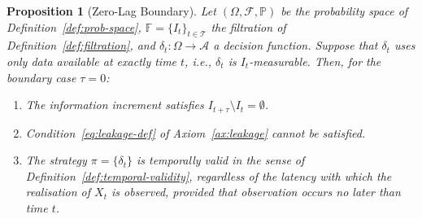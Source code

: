 \documentclass[12pt,openany]{book}
\newcommand{\calI}{\mathcal{I}}
\newcommand{\calA}{\mathcal{A}}
\numberwithin{equation}{chapter}
\theoremstyle{plain}
\newtheorem{proposition}[theorem]{Proposition}
\theoremstyle{definition}
\theoremstyle{remark}
\numberwithin{equation}{chapter}
\theoremstyle{plain}
\def\calI{I}%
\begin{document}
\begin{proposition}[Zero-Lag Boundary]
\label{prop:zero-lag}
Let $(\Omega, \mathcal{F}, \mathbb{P})$ be the probability space of
Definition~\ref{def:prob-space}, $\mathbb{F} = \{\calI_t\}_{t \in
\mathcal{T}}$ the filtration of Definition~\ref{def:filtration}, and
$\delta_t : \Omega \to \calA$ a decision function.  Suppose that
$\delta_t$ uses only data available at exactly time $t$, i.e.,
$\delta_t$ is $\calI_t$-measurable.  Then, for the boundary case
$\tau = 0$:
\begin{enumerate}
  \item[(i)] The information increment satisfies
        $\calI_{t+\tau} \setminus \calI_t = \emptyset$.
  \item[(ii)] Condition~\eqref{eq:leakage-def} of
        Axiom~\ref{ax:leakage} cannot be satisfied.
  \item[(iii)] The strategy $\pi = \{\delta_t\}$ is temporally valid
        in the sense of Definition~\ref{def:temporal-validity},
        regardless of the latency with which the realisation of $X_t$
        is observed, provided that observation occurs no later than
        time $t$.
\end{enumerate}
\end{proposition}
\end{document}

